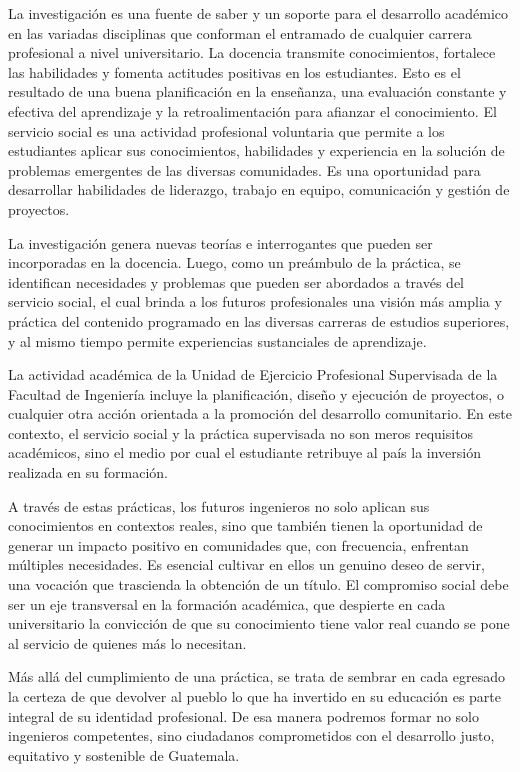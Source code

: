 \documentclass[12pt,spanish,Letterpaper,openany]{book}
\begin{document}
La investigación es una fuente de saber y un soporte para el desarrollo académico en las variadas disciplinas que conforman el entramado de cualquier carrera profesional a nivel universitario. La docencia transmite conocimientos, fortalece las habilidades y fomenta actitudes positivas en los estudiantes. Esto es el resultado de una buena planificación en la enseñanza, una evaluación constante y efectiva del aprendizaje y la retroalimentación para afianzar el conocimiento. El servicio social es una actividad profesional voluntaria que permite a los estudiantes aplicar sus conocimientos, habilidades y experiencia en la solución de problemas emergentes de las diversas comunidades. Es una oportunidad para desarrollar habilidades de liderazgo, trabajo en equipo, comunicación y gestión de proyectos.

La investigación genera nuevas teorías e interrogantes que pueden ser incorporadas en la docencia. Luego, como un preámbulo de la práctica, se identifican necesidades y problemas que pueden ser abordados a través del servicio social, el cual brinda a los futuros profesionales una visión más amplia y práctica del contenido programado en las diversas carreras de estudios superiores, y al mismo tiempo permite experiencias sustanciales de aprendizaje.

La actividad académica de la Unidad de Ejercicio Profesional Supervisada de la Facultad de Ingeniería incluye la planificación, diseño y ejecución de proyectos, o cualquier otra acción orientada a la promoción del desarrollo comunitario. En este contexto, el servicio social y la práctica supervisada no son meros requisitos académicos, sino el medio por cual el estudiante retribuye al país la inversión realizada en su formación.

A través de estas prácticas, los futuros ingenieros no solo aplican sus conocimientos en contextos reales, sino que también tienen la oportunidad de generar un impacto positivo en comunidades que, con frecuencia, enfrentan múltiples necesidades. Es esencial cultivar en ellos un genuino deseo de servir, una vocación que trascienda la obtención de un título. El compromiso social debe ser un eje transversal en la formación académica, que despierte en cada universitario la convicción de que su conocimiento tiene valor real cuando se pone al servicio de quienes más lo necesitan.

Más allá del cumplimiento de una práctica, se trata de sembrar en cada egresado la certeza de que devolver al pueblo lo que ha invertido en su educación es parte integral de su identidad profesional. De esa manera podremos formar no solo ingenieros competentes, sino ciudadanos comprometidos con el desarrollo justo, equitativo y sostenible de Guatemala.
\end{document}
